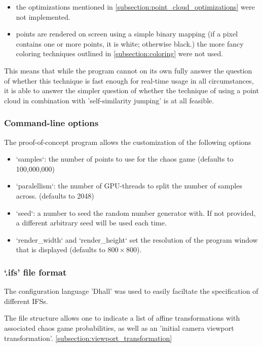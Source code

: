 \documentclass[11pt]{article}
\begin{document}
\begin{itemize}
\item the optimizations mentioned in \autoref{subsection:point_cloud_optimizations} were not implemented.
\item points are rendered on screen using a simple binary mapping (if a pixel contains one or more points, it is white; otherwise black.)
the more fancy coloring techniques outlined in \autoref{subsection:coloring} were not used.
\end{itemize}

This means that while the program cannot on its own fully answer the question of whether
this technique is fast enough for real-time usage in all circumstances,
it is able to answer the simpler question of whether the technique of using a point cloud
in combination with 'self-similarity jumping' is at all feasible.

\subsubsection{Command-line options}
\label{sec:orgc94da2a}

The proof-of-concept program allows the customization of the following options

\begin{itemize}
\item `samples`: the number of points to use for the chaos game (defaults to 100,000,000)
\item `paralellism`: the number of GPU-threads to split the number of samples across. (defaults to 2048)
\item `seed`: a number to seed the random number generator with. If not provided, a different arbitrary seed will be used each time.
\item `render\_width` and `render\_height` set the resolution of the program window that is displayed (defaults to \(800 \times 800\)).
\end{itemize}

\subsubsection{`.ifs' file format}
\label{sec:org4c22d9b}

The configuration language 'Dhall' \cite{gonzalez2019} was used to 
easily faciltate the specification of different IFSs.

The file structure allows one to indicate a list of affine transformations with associated chaos game probabilities,
as well as an 'initial camera viewport transformation'. \autoref{subsection:viewport_transformation}
\end{document}

